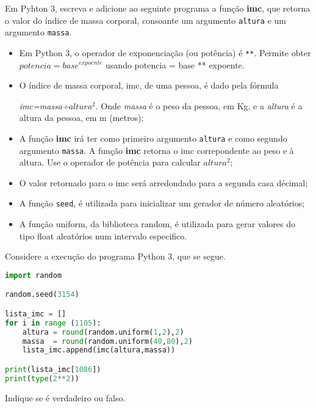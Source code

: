 \documentclass[12pt,varwidth=16cm,border=17pt]{standalone}
\begin{document}
Em Pyhton 3, escreva e adicione ao seguinte programa a função \textbf{imc}, que retorna o valor do índice de massa corporal, consoante um argumento \verb+altura+ e um argumento \verb+massa+.
\begin{itemize}
    
  \item Em Python 3, o operador de exponenciação (ou potência) é \verb+**+. Permite obter $potencia=base^{expoente}$ usando potencia = base ** expoente.
  
  
  
  \item  O índice de massa corporal, imc, de uma pessoa, é dado pela fórmula

  \emph{imc=massa÷$altura^2$}. Onde \emph{massa} é o peso da pessoa, em Kg, e a \emph{altura} é a altura da pessoa, em m (metros);
  \item A função \textbf{imc} irá ter como primeiro argumento \verb+altura+ e como segundo argumento \verb+massa+. A função \textbf{imc} retorna o imc correpondente ao peso e à altura. Use o operador de potência para calcular $altura^2$;
  \item O valor retornado para o imc será arredondado para a segunda casa décimal;
  \item A função \verb+seed+, é utilizada para inicializar um gerador de número aleatórios;
  \item A função uniform, da biblioteca random, é utilizada para gerar valores do tipo float aleatórios num intervalo especifico.
  
  

    
\end{itemize}




Considere a execução do programa Python 3, que se segue. 

\begin{lstlisting}[language=Python]
import random

random.seed(3154)

lista_imc = []
for i in range (1105):
    altura = round(random.uniform(1,2),2)
    massa  = round(random.uniform(40,80),2)
    lista_imc.append(imc(altura,massa))

print(lista_imc[1086])
print(type(2**2))
\end{lstlisting}

Indique se é verdadeiro ou falso.
\end{document}
